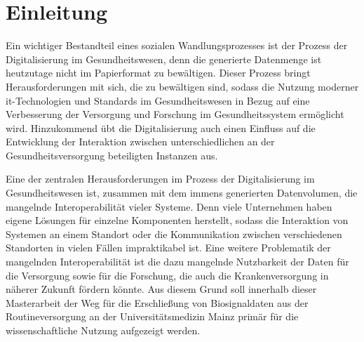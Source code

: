 \chapter{Einleitung} \label{ch:introduction}

Ein wichtiger Bestandteil eines sozialen Wandlungsprozesses ist der Prozess der Digitalisierung im Gesundheitswesen, denn die generierte Datenmenge ist heutzutage nicht im Papierformat zu bewältigen. Dieser Prozess bringt Herausforderungen mit sich, die zu bewältigen sind, sodass die Nutzung moderner \ac{it}-Technologien und Standards im Gesundheitswesen in Bezug auf eine Verbesserung der Versorgung und Forschung im Gesundheitssystem ermöglicht wird. Hinzukommend übt die Digitalisierung auch einen Einfluss auf die Entwicklung der Interaktion zwischen unterschiedlichen an der Gesundheitsversorgung beteiligten Instanzen aus. 

Eine der zentralen Herausforderungen im Prozess der Digitalisierung im Gesundheitswesen ist, zusammen mit dem immens generierten Datenvolumen, die mangelnde Interoperabilität vieler Systeme. Denn viele Unternehmen haben eigene Lösungen für einzelne Komponenten herstellt, sodass die Interaktion von Systemen an einem Standort oder die Kommunikation zwischen verschiedenen Standorten in vielen Fällen impraktikabel ist. Eine weitere Problematik der mangelnden Interoperabilität ist die dazu mangelnde Nutzbarkeit der Daten für die Versorgung sowie für die Forschung, die auch die Krankenversorgung in näherer Zukunft fördern könnte. Aus diesem Grund soll innerhalb dieser Masterarbeit der Weg für die Erschließung von Biosignaldaten aus der Routineversorgung an der Universitätsmedizin Mainz primär für die wissenschaftliche Nutzung aufgezeigt werden.